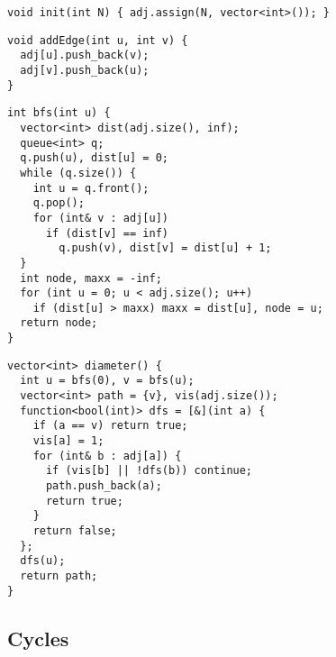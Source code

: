 \documentclass[twoside]{article}
\begin{document}
\begin{multicols*}{2}
\begin{verbatim}
void init(int N) { adj.assign(N, vector<int>()); }
\end{verbatim}
\vspace{-12pt}
\begin{verbatim}
void addEdge(int u, int v) {
  adj[u].push_back(v);
  adj[v].push_back(u);
}
\end{verbatim}
\vspace{-12pt}
\begin{verbatim}
int bfs(int u) {
  vector<int> dist(adj.size(), inf);
  queue<int> q;
  q.push(u), dist[u] = 0;
  while (q.size()) {
    int u = q.front();
    q.pop();
    for (int& v : adj[u])
      if (dist[v] == inf)
        q.push(v), dist[v] = dist[u] + 1;
  }
  int node, maxx = -inf;
  for (int u = 0; u < adj.size(); u++)
    if (dist[u] > maxx) maxx = dist[u], node = u;
  return node;
}
\end{verbatim}
\vspace{-12pt}
\begin{verbatim}
vector<int> diameter() {
  int u = bfs(0), v = bfs(u);
  vector<int> path = {v}, vis(adj.size());
  function<bool(int)> dfs = [&](int a) {
    if (a == v) return true;
    vis[a] = 1;
    for (int& b : adj[a]) {
      if (vis[b] || !dfs(b)) continue;
      path.push_back(a);
      return true;
    }
    return false;
  };
  dfs(u);
  return path;
}
\end{verbatim}

\subsectionfont{\bfseries\sffamily\centering\LARGE}
\vspace{0em}
\subsection*{Cycles}
\vspace{2em}
\subsubsectionfont{\large\bfseries\sffamily\underline}

\end{multicols*}
\end{document}
